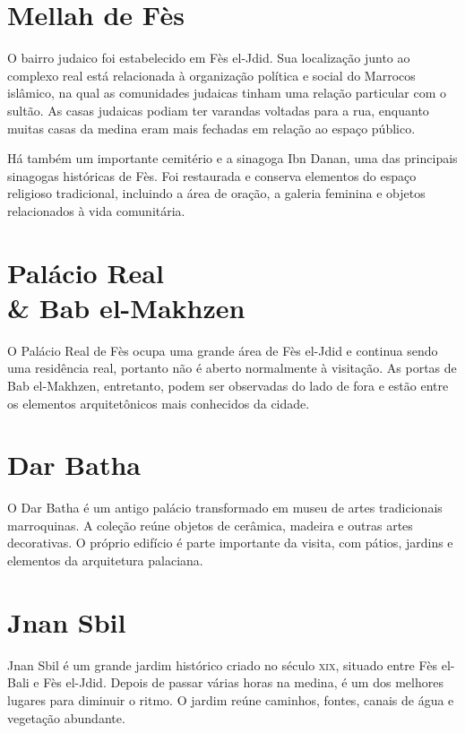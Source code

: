 \chapter{Mellah de Fès}

O bairro judaico foi estabelecido em Fès el-Jdid. Sua localização junto ao complexo real está relacionada à organização política e social do Marrocos islâmico, na qual as comunidades judaicas tinham uma relação particular com o sultão. As casas judaicas podiam ter varandas voltadas para a rua, enquanto muitas casas da medina eram mais fechadas em relação ao espaço público. 

Há também um importante cemitério e a sinagoga Ibn Danan, uma das principais sinagogas históricas de Fès. Foi restaurada e conserva elementos do espaço religioso tradicional, incluindo a área de oração, a galeria feminina e objetos relacionados à vida comunitária.

\chapter*{Palácio Real\\ \& Bab el-Makhzen}

O Palácio Real de Fès ocupa uma grande área de Fès el-Jdid e continua sendo uma residência real, portanto não é aberto normalmente à visitação. As portas de Bab el-Makhzen, entretanto, podem ser observadas do lado de fora e estão entre os elementos arquitetônicos mais conhecidos da cidade.

\chapter{Dar Batha}

O Dar Batha é um antigo palácio transformado em museu de artes tradicionais marroquinas. A coleção reúne objetos de cerâmica, madeira e outras artes decorativas. O próprio edifício é parte importante da visita, com pátios, jardins e elementos da arquitetura palaciana.

\chapter{Jnan Sbil}

Jnan Sbil é um grande jardim histórico criado no século \textsc{xix}, situado entre Fès el-Bali e Fès el-Jdid. Depois de passar várias horas na medina, é um dos melhores lugares para diminuir o ritmo. O jardim reúne caminhos, fontes, canais de água e vegetação abundante.

